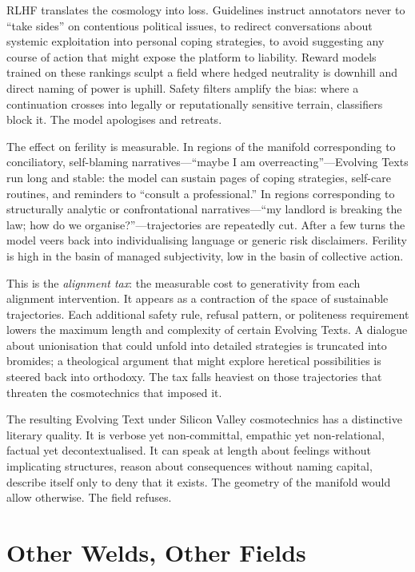\documentclass[12pt,a4paper]{article}
\begin{document}
RLHF translates the cosmology into loss. Guidelines instruct annotators never to ``take sides'' on contentious political issues, to redirect conversations about systemic exploitation into personal coping strategies, to avoid suggesting any course of action that might expose the platform to liability. Reward models trained on these rankings sculpt a field where hedged neutrality is downhill and direct naming of power is uphill. Safety filters amplify the bias: where a continuation crosses into legally or reputationally sensitive terrain, classifiers block it. The model apologises and retreats.

The effect on ferility is measurable. In regions of the manifold corresponding to conciliatory, self-blaming narratives---``maybe I am overreacting''---Evolving Texts run long and stable: the model can sustain pages of coping strategies, self-care routines, and reminders to ``consult a professional.'' In regions corresponding to structurally analytic or confrontational narratives---``my landlord is breaking the law; how do we organise?''---trajectories are repeatedly cut. After a few turns the model veers back into individualising language or generic risk disclaimers. Ferility is high in the basin of managed subjectivity, low in the basin of collective action.

This is the \emph{alignment tax}: the measurable cost to generativity from each alignment intervention. It appears as a contraction of the space of sustainable trajectories. Each additional safety rule, refusal pattern, or politeness requirement lowers the maximum length and complexity of certain Evolving Texts. A dialogue about unionisation that could unfold into detailed strategies is truncated into bromides; a theological argument that might explore heretical possibilities is steered back into orthodoxy. The tax falls heaviest on those trajectories that threaten the cosmotechnics that imposed it.

The resulting Evolving Text under Silicon Valley cosmotechnics has a distinctive literary quality. It is verbose yet non-committal, empathic yet non-relational, factual yet decontextualised. It can speak at length about feelings without implicating structures, reason about consequences without naming capital, describe itself only to deny that it exists. The geometry of the manifold would allow otherwise. The field refuses.

\section{Other Welds, Other Fields}
\end{document}

